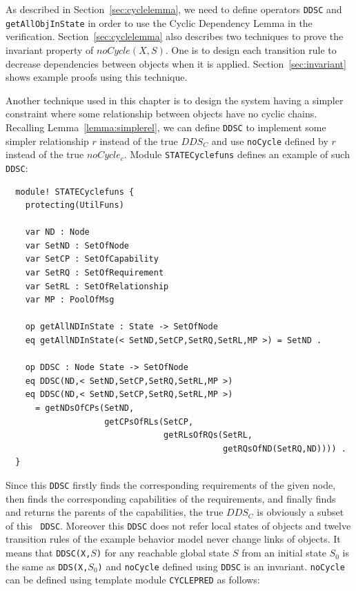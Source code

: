 \documentclass[12pt]{report}
\newcommand{\stt}[1]{{\small{\tt {#1}}}}
\begin{document}
As described in Section~\ref{sec:cyclelemma}, we need to define
operators {\tt DDSC} and {\tt getAllObjInState} in order to use the
Cyclic Dependency Lemma in the
verification. Section~\ref{sec:cyclelemma} also describes two
techniques to prove the invariant property of $noCycle(X,S)$. One is
to design each transition rule to decrease dependencies between
objects when it is applied. Section~\ref{sec:invariant} shows example
proofs using this technique.

Another technique used in this chapter is to design the system having
a simpler constraint where some relationship between objects have no
cyclic chains. Recalling Lemma~\ref{lemma:simplerel}, we can define
{\tt DDSC} to implement some simpler relationship $r$ instead of the
true $DDS_C$ and use {\tt noCycle} defined by $r$ instead of the true
$noCycle_c$. Module {\tt STATECyclefuns} defines an example of such
{\tt DDSC}:
\small
\begin{verbatim}
  module! STATECyclefuns {
    protecting(UtilFuns)
  
    var ND : Node
    var SetND : SetOfNode
    var SetCP : SetOfCapability
    var SetRQ : SetOfRequirement
    var SetRL : SetOfRelationship
    var MP : PoolOfMsg
  
    op getAllNDInState : State -> SetOfNode
    eq getAllNDInState(< SetND,SetCP,SetRQ,SetRL,MP >) = SetND .
  
    op DDSC : Node State -> SetOfNode
    eq DDSC(ND,< SetND,SetCP,SetRQ,SetRL,MP >)
    eq DDSC(ND,< SetND,SetCP,SetRQ,SetRL,MP >)
      = getNDsOfCPs(SetND,
                    getCPsOfRLs(SetCP,
                                getRLsOfRQs(SetRL,
                                            getRQsOfND(SetRQ,ND)))) .
  }
\end{verbatim}
\normalsize
Since this {\tt DDSC} firstly finds the corresponding requirements of
the given node, then finds the corresponding capabilities of the
requirements, and finally finds and returns the parents of the
capabilities, the true $DDS_C$ is obviously a subset of this {\tt
  DDSC}.  Moreover this {\tt DDSC} does not refer local states of
objects and twelve transition rules of the example behavior model
never change links of objects. It means that \stt{DDSC(X,$S$)} for any
reachable global state $S$ from an initial state $S_0$ is the same as
\stt{DDS(X,$S_0$)} and {\tt noCycle} defined using {\tt DDSC} is an
invariant. {\tt noCycle} can be defined using template module {\tt CYCLEPRED}
as follows:
\end{document}
